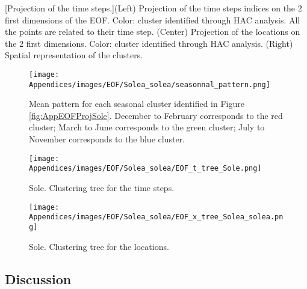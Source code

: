 [Projection of the time steps.]{(Left) Projection of the time steps indices on the 2 first dimensions of the EOF. Color: cluster identified through HAC analysis. All the points are related to their time step. (Center) Projection of the locations on the 2 first dimensions. Color: cluster identified through HAC analysis. (Right) Spatial representation of the clusters.}

\label{fig:AppEOFProjSole}


\begin{figure}[H]
   \begin{center}
      \texttt{[image: Appendices/images/EOF/Solea\_solea/seasonnal\_pattern.png]}
   \end{center}
   \caption[Mean pattern for each seasonal cluster identified in Figure \ref{fig:AppEOFProjSole}]
   {Mean pattern for each seasonal cluster identified in Figure \ref{fig:AppEOFProjSole}. December to February corresponds to the red cluster; March to June corresponds to the green cluster; July to November corresponds to the blue cluster.}
   \label{fig:AppSeasonSole}
\end{figure}

\begin{figure}[H]
   \begin{center}
      \texttt{[image: Appendices/images/EOF/Solea\_solea/EOF\_t\_tree\_Sole.png]}
   \end{center}
   \caption[Sole. Clustering tree for the time steps.]
   {Sole. Clustering tree for the time steps.}
   \label{fig:AppClustt}
\end{figure}


\begin{figure}[H]
   \begin{center}
      \texttt{[image: Appendices/images/EOF/Solea\_solea/EOF\_x\_tree\_Solea\_solea.png]}
   \end{center}
   \caption[Sole. Clustering tree for the locations.]
   {Sole. Clustering tree for the locations.}
   \label{fig:AppClustx}
\end{figure}


\subsection{Discussion}

